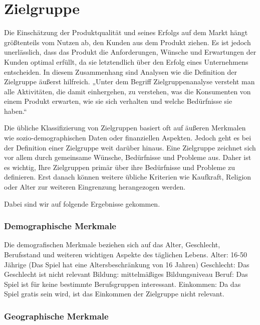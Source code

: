
\section{Zielgruppe}\label{sec:zielgruppe}

\renewcommand{\kapitelautor}{Autor: Nils Hubmann} %

%
Die Einschätzung der Produktqualität und seines Erfolgs auf dem Markt hängt größtenteils vom Nutzen ab, den Kunden aus dem Produkt ziehen.
Es ist jedoch unerlässlich, dass das Produkt die Anforderungen, Wünsche und Erwartungen der Kunden optimal erfüllt, da sie letztendlich über den Erfolg eines Unternehmens entscheiden.
In diesem Zusammenhang sind Analysen wie die Definition der Zielgruppe äußerst hilfreich.
„Unter dem Begriff Zielgruppenanalyse versteht man alle Aktivitäten, die damit einhergehen, zu verstehen, was die Konsumenten von einem
Produkt erwarten, wie sie sich verhalten und welche Bedürfnisse sie haben.“ \cite{Zielgruppe}


Die übliche Klassifizierung von Zielgruppen basiert oft auf äußeren Merkmalen wie sozio-demographischen Daten oder finanziellen Aspekten.
Jedoch geht es bei der Definition einer Zielgruppe weit darüber hinaus. Eine Zielgruppe zeichnet sich vor allem durch gemeinsame Wünsche,
Bedürfnisse und Probleme aus. Daher ist es wichtig, Ihre Zielgruppen primär über ihre Bedürfnisse und Probleme zu definieren.
Erst danach können weitere übliche Kriterien wie Kaufkraft, Religion oder Alter zur weiteren Eingrenzung herangezogen werden. \cite[vgl.]{Zielgruppedef}

Dabei sind wir auf folgende Ergebnisse gekommen.

\subsubsection{Demographische Merkmale}\label{subsubsec:Demographische-Merkmale}

Die demografischen Merkmale beziehen sich auf das Alter, Geschlecht, Berufsstand und weiteren wichtigen Aspekte des täglichen Lebens.\cite[vgl.]{DemographischeMerkmale}
Alter: 16-50 Jährige (Das Spiel hat eine Altersbeschränkung von 16 Jahren)
Geschlecht: Das Geschlecht ist nicht relevant
Bildung: mittelmäßiges Bildungsniveau
Beruf: Das Spiel ist für keine bestimmte Berufsgruppen interessant.
Einkommen: Da das Spiel gratis sein wird, ist das Einkommen der Zielgruppe nicht
relevant.

\subsubsection{Geographische Merkmale}\label{subsubsec:Geographische-Merkmale}

